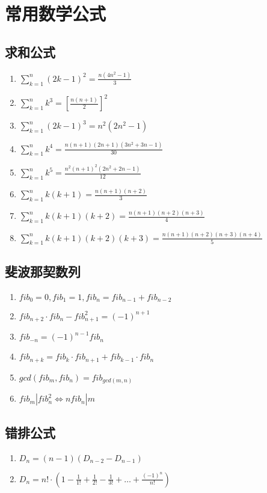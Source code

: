 \section{常用数学公式}
	\subsection{求和公式}
		\begin{enumerate}
			\item $\sum_{k=1}^{n}(2k-1)^2 = \frac{n(4n^2-1)}{3}	$
			\item $\sum_{k=1}^{n}k^3 = [\frac{n(n+1)}{2}]^2	$
			\item $\sum_{k=1}^{n}(2k-1)^3 = n^2(2n^2-1)	$
			\item $\sum_{k=1}^{n}k^4 = \frac{n(n+1)(2n+1)(3n^2+3n-1)}{30}  $
			\item $\sum_{k=1}^{n}k^5 = \frac{n^2(n+1)^2(2n^2+2n-1)}{12}	$
			\item $\sum_{k=1}^{n}k(k+1) = \frac{n(n+1)(n+2)}{3}	$
			\item $\sum_{k=1}^{n}k(k+1)(k+2) = \frac{n(n+1)(n+2)(n+3)}{4} $
			\item $\sum_{k=1}^{n}k(k+1)(k+2)(k+3) = \frac{n(n+1)(n+2)(n+3)(n+4)}{5} $
		\end{enumerate}
	\subsection{斐波那契数列}
		\begin{enumerate}
			\item $fib_0=0, fib_1=1, fib_n=fib_{n-1}+fib_{n-2}$
			\item $fib_{n+2} \cdot fib_n-fib_{n+1}^2=(-1)^{n+1}$
			\item $fib_{-n}=(-1)^{n-1}fib_n$
			\item $fib_{n+k}=fib_k \cdot fib_{n+1}+fib_{k-1} \cdot fib_n$
			\item $gcd(fib_m, fib_n)=fib_{gcd(m, n)}$
			\item $fib_m|fib_n^2\Leftrightarrow nfib_n|m$
		\end{enumerate}
	\subsection{错排公式}
		\begin{enumerate}
			\item $D_n = (n-1)(D_{n-2}-D_{n-1})$
			\item $D_n = n! \cdot (1-\frac{1}{1!}+\frac{1}{2!}-\frac{1}{3!}+\ldots+\frac{(-1)^n}{n!})$
		\end{enumerate}
